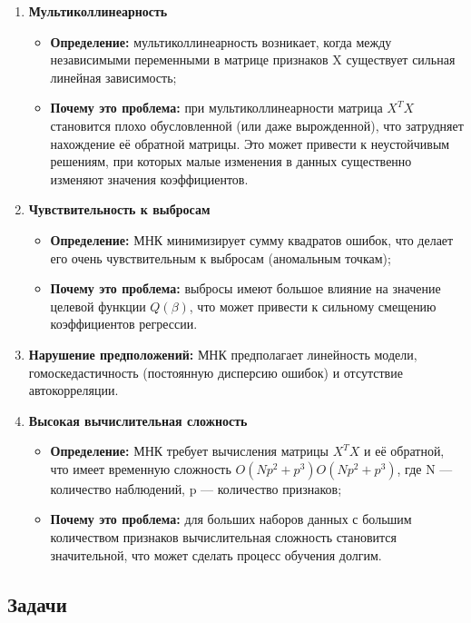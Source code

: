 \begin{enumerate}

    \item \textbf{Мультиколлинеарность}
		\begin{itemize}
			\item \textbf{Определение:} мультиколлинеарность возникает, когда между независимыми переменными в матрице признаков X существует сильная линейная зависимость;
			\item \textbf{Почему это проблема:} при мультиколлинеарности матрица \(X^T X\) становится плохо обусловленной (или даже вырожденной), что затрудняет нахождение её обратной матрицы. Это может привести к неустойчивым решениям, при которых малые изменения в данных существенно изменяют значения коэффициентов.
		\end{itemize}

	\item \textbf{Чувствительность к выбросам}
		\begin{itemize}
			\item \textbf{Определение:} МНК минимизирует сумму квадратов ошибок, что делает его очень чувствительным к выбросам (аномальным точкам);
			\item \textbf{Почему это проблема:} выбросы имеют большое влияние на значение целевой функции \(Q(\beta)\), что может привести к сильному смещению коэффициентов регрессии.
		\end{itemize}

	\item \textbf{Нарушение предположений:} МНК предполагает линейность модели, гомоскедастичность (постоянную дисперсию ошибок) и отсутствие автокорреляции.

	\item \textbf{Высокая вычислительная сложность}
		\begin{itemize}
			\item \textbf{Определение:} МНК требует вычисления матрицы \(X^T X\) и её обратной, что имеет временную сложность \(O(Np^2+p^3)O(Np^2+p^3)\), где N — количество наблюдений, p — количество признаков;
			\item \textbf{Почему это проблема:} для больших наборов данных с большим количеством признаков вычислительная сложность становится значительной, что может сделать процесс обучения долгим.
		\end{itemize}

\end{enumerate}

\subsection{Задачи}

